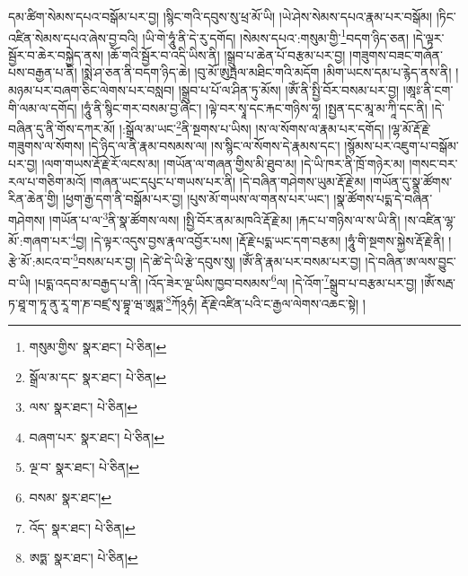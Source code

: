 དམ་ཚིག་སེམས་དཔའ་བསྒོམ་པར་བྱ། །སྙིང་གའི་དབུས་སུ་ཕྲ་མོ་ཡི། །ཡེ་ཤེས་སེམས་དཔའ་རྣམ་པར་བསྒོམ། །ཏིང་འཛིན་སེམས་དཔའ་ཞེས་བྱ་བའི། །ཡི་གེ་ཧཱུཾ་ནི་དེ་རུ་དགོད། །སེམས་དཔའ་:གསུམ་གྱི་\footnote{གསུམ་གྱིས་  སྣར་ཐང་།  པེ་ཅིན། }བདག་ཉིད་ཅན། །དེ་ལྟར་སྦྱོར་བ་ཆེར་བསྐྱེད་ནས། །ཆོ་གའི་སྦྱོར་བ་འདི་ཡིས་ནི། །སྒྲུབ་པ་ཆེན་པོ་བརྩམ་པར་བྱ། །གཟུགས་བཟང་གཞོན་པས་བརྒྱན་པ་ནི། །སྨེ་ཤ་ཅན་ནི་བདག་ཉིད་ཆེ། །བུ་མོ་ཨུཏྤལ་མཐིང་གའི་མདོག །མིག་ཡངས་དམ་པ་རྙེད་ནས་ནི། །མཉམ་པར་བཞག་ཅིང་ལེགས་པར་བསླབ། །སྒྲུབ་པ་པོ་ལ་ཤིན་ཏུ་མོས། །ཨོཾ་ནི་སྤྱི་བོར་བསམ་པར་བྱ། །ཨཱཿ་ནི་ངག་གི་ལམ་ལ་དགོད། །ཧཱུཾ་ནི་སྙིང་གར་བསམ་བྱ་ཞིང་། །ལྟེ་བར་སྭཱ་དང་རྐང་གཉིས་ཧཱ། །སྤྱན་དང་མཱ་མ་ཀཱི་དང་ནི། །དེ་བཞིན་དུ་ནི་གོས་དཀར་མོ། །:སྒྲོལ་མ་ཡང་\footnote{སྒྲོལ་མ་དང་  སྣར་ཐང་།  པེ་ཅིན། }ནི་སྔགས་པ་ཡིས། །ས་ལ་སོགས་ལ་རྣམ་པར་དགོད། །ལྷ་མོ་རྡོ་རྗེ་གཟུགས་ལ་སོགས། །དེ་ཉིད་ལ་ནི་རྣམ་བསམས་ལ། །ས་སྙིང་ལ་སོགས་དེ་རྣམས་དང་། །སྙོམས་པར་འཇུག་པ་བསྒོམ་པར་བྱ། །ལག་གཡས་རྡོ་རྗེ་རོ་ལངས་མ། །གཡོན་ལ་གཞན་གྱིས་མི་ཐུབ་མ། །དེ་ཡི་ཁར་ནི་ཁྲོ་གཉེར་མ། །གསང་བར་རལ་པ་གཅིག་མའོ། །གཞན་ཡང་དཔུང་པ་གཡས་པར་ནི། །དེ་བཞིན་གཤེགས་ཡུམ་རྡོ་རྗེ་མ། །གཡོན་དུ་སྣ་ཚོགས་རིན་ཆེན་གྱི། །ཕྱག་རྒྱ་དག་ནི་བསྒོམ་པར་བྱ། །པུས་མོ་གཡས་ལ་གནས་པར་ཡང་། །སྣ་ཚོགས་པདྨ་དེ་བཞིན་གཤེགས། །གཡོན་པ་ལ་\footnote{ལས་  སྣར་ཐང་།  པེ་ཅིན། }ནི་སྣ་ཚོགས་ལས། །སྤྱི་བོར་ནམ་མཁའི་རྡོ་རྗེ་མ། །རྐང་པ་གཉིས་ལ་ས་ཡི་ནི། །ས་འཛིན་ལྷ་མོ་:གཞག་པར་\footnote{བཞག་པར་  སྣར་ཐང་།  པེ་ཅིན། }བྱ། །དེ་ལྟར་འདུས་བྱས་རྣལ་འབྱོར་པས། །རྡོ་རྗེ་པདྨ་ཡང་དག་བརྩམ། །ཧཱུཾ་གི་སྔགས་སྐྱེས་རྡོ་རྗེ་ནི། །རྩེ་མོ་:མངའ་བ་\footnote{ལྔ་བ་  སྣར་ཐང་།  པེ་ཅིན། }བསམ་པར་བྱ། །དེ་ཚེ་དེ་ཡི་རྩེ་དབུས་སུ། །ཨོཾ་ནི་རྣམ་པར་བསམ་པར་བྱ། །དེ་བཞིན་ཨ་ལས་བྱུང་བ་ཡི། །པདྨ་འདབ་མ་བརྒྱད་པ་ནི། །འོད་ཟེར་ལྔ་ཡིས་ཁྱབ་བསམས་\footnote{བསམ་  སྣར་ཐང་། }ལ། །དེ་འོག་\footnote{འོད་  སྣར་ཐང་།  པེ་ཅིན། }སྒྲུབ་པ་བརྩམ་པར་བྱ། །ཨོཾ་སརྦ་ཏ་ཐཱ་ག་ཏཱ་ནུ་རཱ་ག་ཎ་བཛྲ་སྭ་བྷཱ་ཝ་ཨཱཏྨ་\footnote{ཨཏྨ་  སྣར་ཐང་།  པེ་ཅིན། }ཀོ྅ཧཾ། རྡོ་རྗེ་འཛིན་པའི་ང་རྒྱལ་ལེགས་འཆང་སྟེ། །
